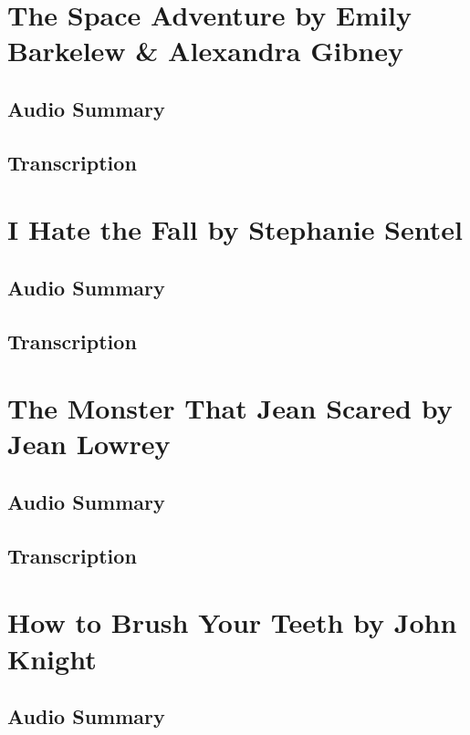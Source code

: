 \section{The Space Adventure by Emily Barkelew \& Alexandra Gibney}

\subsection{Audio Summary}

\subsection{Transcription}

\section{I Hate the Fall by Stephanie Sentel}

\subsection{Audio Summary}

\subsection{Transcription}

\section{The Monster That Jean Scared by Jean Lowrey}

\subsection{Audio Summary}

\subsection{Transcription}

\section{How to Brush Your Teeth by John Knight}

\subsection{Audio Summary}

